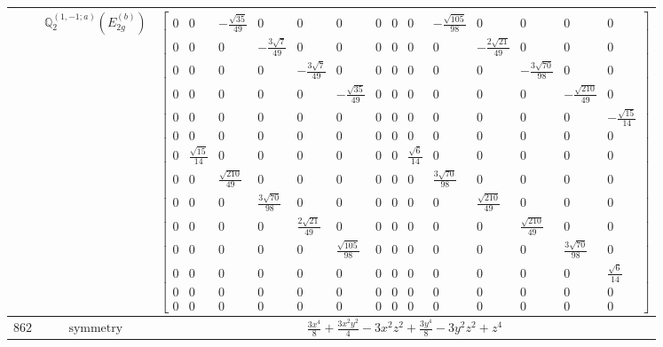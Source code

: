 \documentclass[fleqn,8pt,landscape]{jsarticle}
\begin{document}
\begin{longtable}{ccc}
$  $ & $ \mathbb{Q}_{2}^{(1,-1;a)}(E_{2g}^{(b)}) $ & $ \begin{bmatrix} 0 & 0 & - \frac{\sqrt{35}}{49} & 0 & 0 & 0 & 0 & 0 & 0 & - \frac{\sqrt{105}}{98} & 0 & 0 & 0 & 0 \\ 0 & 0 & 0 & - \frac{3 \sqrt{7}}{49} & 0 & 0 & 0 & 0 & 0 & 0 & - \frac{2 \sqrt{21}}{49} & 0 & 0 & 0 \\ 0 & 0 & 0 & 0 & - \frac{3 \sqrt{7}}{49} & 0 & 0 & 0 & 0 & 0 & 0 & - \frac{3 \sqrt{70}}{98} & 0 & 0 \\ 0 & 0 & 0 & 0 & 0 & - \frac{\sqrt{35}}{49} & 0 & 0 & 0 & 0 & 0 & 0 & - \frac{\sqrt{210}}{49} & 0 \\ 0 & 0 & 0 & 0 & 0 & 0 & 0 & 0 & 0 & 0 & 0 & 0 & 0 & - \frac{\sqrt{15}}{14} \\ 0 & 0 & 0 & 0 & 0 & 0 & 0 & 0 & 0 & 0 & 0 & 0 & 0 & 0 \\ 0 & \frac{\sqrt{15}}{14} & 0 & 0 & 0 & 0 & 0 & 0 & \frac{\sqrt{6}}{14} & 0 & 0 & 0 & 0 & 0 \\ 0 & 0 & \frac{\sqrt{210}}{49} & 0 & 0 & 0 & 0 & 0 & 0 & \frac{3 \sqrt{70}}{98} & 0 & 0 & 0 & 0 \\ 0 & 0 & 0 & \frac{3 \sqrt{70}}{98} & 0 & 0 & 0 & 0 & 0 & 0 & \frac{\sqrt{210}}{49} & 0 & 0 & 0 \\ 0 & 0 & 0 & 0 & \frac{2 \sqrt{21}}{49} & 0 & 0 & 0 & 0 & 0 & 0 & \frac{\sqrt{210}}{49} & 0 & 0 \\ 0 & 0 & 0 & 0 & 0 & \frac{\sqrt{105}}{98} & 0 & 0 & 0 & 0 & 0 & 0 & \frac{3 \sqrt{70}}{98} & 0 \\ 0 & 0 & 0 & 0 & 0 & 0 & 0 & 0 & 0 & 0 & 0 & 0 & 0 & \frac{\sqrt{6}}{14} \\ 0 & 0 & 0 & 0 & 0 & 0 & 0 & 0 & 0 & 0 & 0 & 0 & 0 & 0 \\ 0 & 0 & 0 & 0 & 0 & 0 & 0 & 0 & 0 & 0 & 0 & 0 & 0 & 0 \end{bmatrix} $ \\ \hline
$ 862 $ & $ \text{symmetry} $ & $ \frac{3 x^{4}}{8} + \frac{3 x^{2} y^{2}}{4} - 3 x^{2} z^{2} + \frac{3 y^{4}}{8} - 3 y^{2} z^{2} + z^{4} $ \\

\end{longtable}
\end{document}
